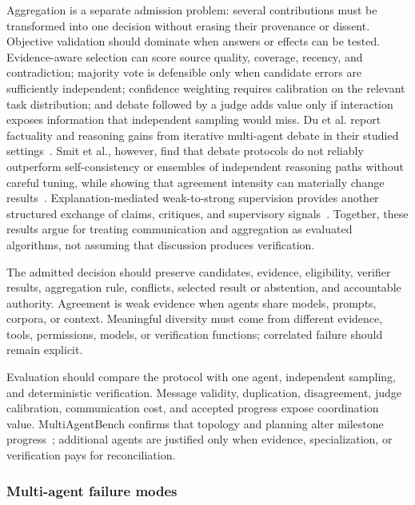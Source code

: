 Aggregation is a separate admission problem: several contributions must be transformed into one decision without erasing their provenance or dissent. Objective validation should dominate when answers or effects can be tested. Evidence-aware selection can score source quality, coverage, recency, and contradiction; majority vote is defensible only when candidate errors are sufficiently independent; confidence weighting requires calibration on the relevant task distribution; and debate followed by a judge adds value only if interaction exposes information that independent sampling would miss. Du et al. report factuality and reasoning gains from iterative multi-agent debate in their studied settings~\cite{du2024multiagentdebate}. Smit et al., however, find that debate protocols do not reliably outperform self-consistency or ensembles of independent reasoning paths without careful tuning, while showing that agreement intensity can materially change results~\cite{smit2024mad}. Explanation-mediated weak-to-strong supervision provides another structured exchange of claims, critiques, and supervisory signals~\cite{zakershahrak2024explanation}. Together, these results argue for treating communication and aggregation as evaluated algorithms, not assuming that discussion produces verification.

The admitted decision should preserve candidates, evidence, eligibility, verifier results, aggregation rule, conflicts, selected result or abstention, and accountable authority. Agreement is weak evidence when agents share models, prompts, corpora, or context. Meaningful diversity must come from different evidence, tools, permissions, models, or verification functions; correlated failure should remain explicit.

Evaluation should compare the protocol with one agent, independent sampling, and deterministic verification. Message validity, duplication, disagreement, judge calibration, communication cost, and accepted progress expose coordination value. MultiAgentBench confirms that topology and planning alter milestone progress~\cite{zhu2025multiagentbench}; additional agents are justified only when evidence, specialization, or verification pays for reconciliation.

\subsubsection{Multi-agent failure modes}

